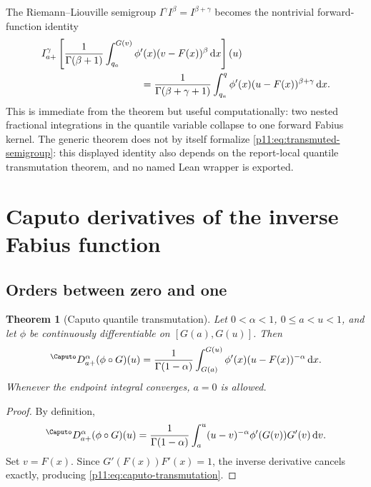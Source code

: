 \documentclass[11pt,oneside]{article}
\newtheorem{theorem}{Theorem}[section]
\theoremstyle{definition}
\theoremstyle{remark}
\newcommand{\dd}{\,\mathrm d}
\newcommand{\1}{\mathbf 1}
\begin{document}
The Riemann--Liouville semigroup $I^{\gamma}I^{\beta}=I^{\beta+\gamma}$
becomes the nontrivial forward-function identity
\begin{align}
 &I_{a+}^{\gamma}\left[
 \frac1{\Gamma(\beta+1)}
 \int_{q_a}^{G(v)}\phi'(x)(v-F(x))^\beta\dd x
 \right](u)\notag\\
 &\hspace{35mm}=
 \frac1{\Gamma(\beta+\gamma+1)}
 \int_{q_a}^{q}\phi'(x)(u-F(x))^{\beta+\gamma}\dd x.
 \label{p11:eq:transmuted-semigroup}
\end{align}
This is immediate from the theorem but useful computationally: two nested
fractional integrations in the quantile variable collapse to one forward
Fabius kernel.
The generic theorem  does not by itself formalize
\eqref{p11:eq:transmuted-semigroup}: this displayed identity also depends on the
report-local quantile transmutation theorem, and no named Lean wrapper is exported.

\section{Caputo derivatives of the inverse Fabius function}
\label{p11:sec:caputo}

\subsection{Orders between zero and one}

\begin{theorem}[Caputo quantile transmutation]
\label{p11:thm:caputo-transmutation}
Let $0<\alpha<1$, $0\le a<u<1$, and let $\phi$ be continuously
differentiable on $[G(a),G(u)]$.  Then
\begin{equation}
 {}^{\Caputo}D_{a+}^{\alpha}(\phi\circ G)(u)
 =\frac1{\Gamma(1-\alpha)}
  \int_{G(a)}^{G(u)}
  \phi'(x)(u-F(x))^{-\alpha}\dd x.
 \label{p11:eq:caputo-transmutation}
\end{equation}
Whenever the endpoint integral converges, $a=0$ is allowed.
\end{theorem}

\begin{proof}
By definition,
\begin{equation}
 {}^{\Caputo}D_{a+}^{\alpha}(\phi\circ G)(u)
 =\frac1{\Gamma(1-\alpha)}
  \int_a^u(u-v)^{-\alpha}\phi'(G(v))G'(v)\dd v.
\end{equation}
Set $v=F(x)$.  Since $G'(F(x))F'(x)=1$, the inverse derivative cancels
exactly, producing \eqref{p11:eq:caputo-transmutation}.
\end{proof}
\end{document}
